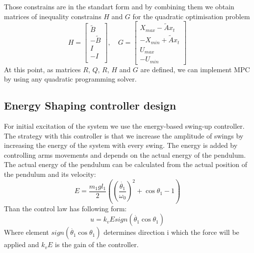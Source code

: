 Those constrains are in the standart form and by combining them we obtain matrices of inequality constrains $H$ and $G$ for the quadratic optimisation problem
\begin{equation}
	H = \begin{bmatrix}
	\tilde{B}\\
	-\tilde{B}\\
	I\\
	-I\\
	\end{bmatrix}, \quad
	G = \begin{bmatrix}
	X_{max} - \tilde{A}x_t\\
	-X_{min} + \tilde{A}x_t\\
	U_{max}\\
	-U_{min}
	\end{bmatrix}
\end{equation}
At this point, as matrices $R$, $Q$, $R$, $H$ and $G$ are defined, we can implement MPC by using any quadratic programming solver.
\subsection{Energy Shaping controller design}
For initial excitation of the system we use the energy-based swing-up controller. The strategy with this controller is that we increase the amplitude of swings by increasing the energy of the system with every swing. The energy is added by controlling arms movements and depends on the actual energy of the pendulum. The actual energy of the pendulum can be calculated from the actual position of the pendulum and its velocity: 
\begin{equation}
E = \frac{m_1gl_1}{2}((\frac{\dot{\theta_1}}{\omega_0})^2+\cos\theta_1 - 1)
\end{equation}
Than the control law has following form:
\begin{equation}
	u = k_vEsign(\dot{\theta_1}\cos\theta_1)
\end{equation}
Where element $sign(\dot{\theta_1}\cos\theta_1)$ determines direction i which the force will be applied and $k_vE$ is the gain of the controller.







